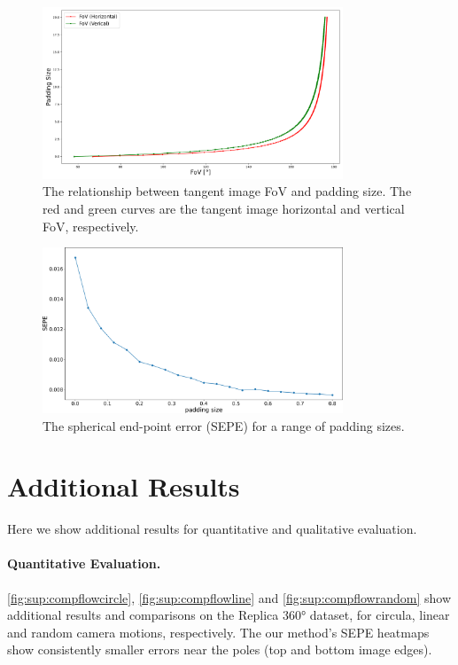 \begin{figure}[hbt!]
	\centering
	\includegraphics[width=0.80\textwidth]{images/paddingsize_vs_fov.pdf}
	\caption{\label{fig:sup:paddingvsfov}%
		The relationship between tangent image FoV and padding size. The red and green curves are the tangent image horizontal and vertical FoV, respectively.}
\end{figure}

\begin{figure}[hbt!]
	\centering
	\includegraphics[width=0.80\textwidth]{images/abla_padding.pdf}
	\caption{\label{fig:sup:ablationpadding}%
		The spherical end-point error (SEPE) for a range of padding sizes.}
\end{figure}


\section{Additional Results}

Here we show additional results for quantitative and qualitative evaluation.

\paragraph{Quantitative Evaluation.}

\cref{fig:sup:compflowcircle}, \cref{fig:sup:compflowline} and \cref{fig:sup:compflowrandom} show additional results and comparisons on the Replica 360° dataset, for circula, linear and random camera motions, respectively.
The our method's SEPE heatmaps show consistently smaller errors near the poles (top and bottom image edges).

